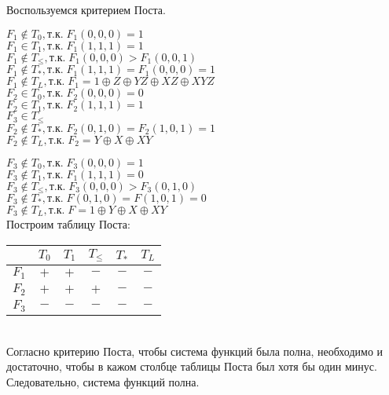 \documentclass[a4paper,12pt]{report} %
\begin{document}
\begin{flushleft}
	Воспользуемся критерием Поста.
	\begin{multicols}{2}
		$F_1\notin{T_0}, \text{т.к.}\; F_1(0,0,0)=1 $ \\
		$F_1 \in{T_1},\text{т.к.}\; F_1(1,1,1)=1 $ \\
		$F_1 \notin{T_\leq}, \text{т.к.}\; F_1(0,0,0)>F_1(0,0,1) $ \\
		$F_1 \notin{T_*}, \text{т.к.}\; F_1(1,1,1)=F_1(0,0,0) = 1 $ \\
		$F_1 \notin{T_L}, \text{т.к.}\; F_1=1 \oplus Z \oplus YZ \oplus XZ \oplus XYZ$ \\
		\bigskip
		$F_2 \in{T_0}, \text{т.к.}\; F_2(0,0,0)=0 $ \\
		$F_2 \in{T_1},\text{т.к.}\; F_2(1,1,1)=1 $ \\
		$F_3 \in{T_\leq}$ \\
		$F_2 \notin{T_*}, \text{т.к.}\; F_2(0,1,0)=F_2(1,0,1) = 1 $ \\
		$F_2 \notin{T_L}, \text{т.к.}\; F_2=Y \oplus X \oplus XY $ \\
	\end{multicols}
	\bigskip
	$F_3 \notin{T_0}, \text{т.к.}\; F_3(0,0,0)=1 $ \\
	$F_3 \notin{T_1},\text{т.к.}\; F_1(1,1,1)=0 $ \\
	$F_3 \notin{T_\leq}, \text{т.к.}\; F_3(0,0,0)>F_3(0,1,0) $ \\
	$F_3 \notin{T_*}, \text{т.к.}\; F(0,1,0)=F(1,0,1) = 0 $ \\
	$F_3 \notin{T_L}, \text{т.к.}\; F=1 \oplus Y \oplus X \oplus XY$ \\
	
	Построим таблицу Поста:\\
	\bigskip
	\begin{tabular}{| c | c | c | c | c | c |}
		\hline
		       & $T_0$ & $T_1$ & $T_\leq$ & $T_*$ & $T_L$ \\
		\hline
		$F_1 $ & $+$   & $+$   & $-$      & $-$   & $-$   \\
		\hline
		$F_2$  & $+$   & $+$   & $+$      & $-$   & $-$   \\
		\hline
		$F_3$  & $-$   & $-$   & $-$      & $-$   & $-$   \\
		\hline
	\end{tabular}\\
	\bigskip
	Согласно критерию Поста, чтобы система функций была полна, необходимо и достаточно, чтобы в кажом столбце таблицы Поста был хотя бы один минус.\\
	Следовательно, система функций полна.\\
	
	\textbf{\color{red}{Сделать базисы}}
\end{flushleft}
\end{document}
